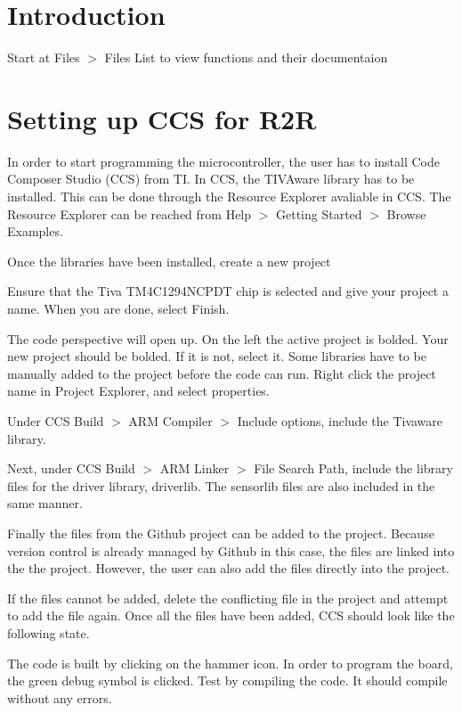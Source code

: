 \hypertarget{index_intro_sec}{}\section{Introduction}\label{index_intro_sec}
Start at {\ttfamily Files $>$ Files List} to view functions and their documentaion\hypertarget{index_setup}{}\section{Setting up C\+C\+S for R2R}\label{index_setup}
In order to start programming the microcontroller, the user has to install Code Composer Studio (C\+CS) from TI. In C\+CS, the T\+I\+V\+Aware library has to be installed. This can be done through the Resource Explorer avaliable in C\+CS. The Resource Explorer can be reached from Help $>$ Getting Started $>$ Browse Examples.

 Once the libraries have been installed, create a new project

 Ensure that the Tiva T\+M4\+C1294\+N\+C\+P\+DT chip is selected and give your project a name. When you are done, select Finish.

 The code perspective will open up. On the left the active project is bolded. Your new project should be bolded. If it is not, select it. Some libraries have to be manually added to the project before the code can run. Right click the project name in Project Explorer, and select properties.

Under C\+CS Build $>$ A\+RM Compiler $>$ Include options, include the Tivaware library.

 Next, under C\+CS Build $>$ A\+RM Linker $>$ File Search Path, include the library files for the driver library, driverlib. The sensorlib files are also included in the same manner.

 Finally the files from the Github project can be added to the project. Because version control is already managed by Github in this case, the files are linked into the the project. However, the user can also add the files directly into the project.

 If the files cannot be added, delete the conflicting file in the project and attempt to add the file again. Once all the files have been added, C\+CS should look like the following state.

 The code is built by clicking on the hammer icon. In order to program the board, the green debug symbol is clicked. Test by compiling the code. It should compile without any errors.

